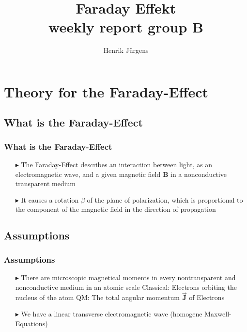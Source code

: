 \documentclass[11pt,a4paper]{beamer}
\author{Henrik Jürgens}
\title{\textbf{Faraday Effekt}\\ weekly report group B}
\begin{document}
\maketitle
\frame{\tableofcontents[currentsection]}
 \section{Theory for the Faraday-Effect}
\begin{frame} %
\subsection{What is the Faraday-Effect}
  \frametitle{What is the Faraday-Effect} %
  \begin{enumerate}
  \item[$\blacktriangleright$]
  	The Faraday-Effect describes an interaction between light, as an electromagnetic wave, and a given magnetic field \textbf{B} in a nonconductive transparent medium
  \newline
  \item[$\blacktriangleright$]
    It causes a rotation $\beta$ of the plane of polarization, which is proportional to the component of the magnetic field in the direction of propagation
  \end{enumerate}
\end{frame}
\begin{frame}
\subsection{Assumptions}
\frametitle{Assumptions}
\begin{enumerate}
\item[$\blacktriangleright$]
There are microscopic magnetical moments in every nontransparent and nonconductive medium in an atomic scale\newline\newline
 Classical: Electrons orbiting the nucleus of the atom\newline
 QM: The total angular momentum $\vec{\textbf{J}}$ of Electrons\newline
\item[$\blacktriangleright$]
We have a linear transverse electromagnetic wave (homogene Maxwell-Equations)
  
\end{enumerate}
\end{frame}
\end{document}
